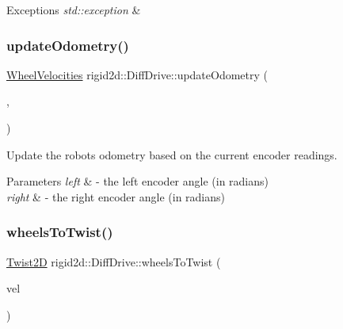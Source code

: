 \begin{DoxyExceptions}{Exceptions}
{\em std\+::exception} & \\
\hline
\end{DoxyExceptions}
\mbox{\label{classrigid2d_1_1DiffDrive_af0ec14baf8f1bd40e1d55226f087ef74}} 
\subsubsection{\texorpdfstring{update\+Odometry()}{updateOdometry()}}
{\footnotesize\ttfamily \hyperlink{structrigid2d_1_1WheelVelocities}{Wheel\+Velocities} rigid2d\+::\+Diff\+Drive\+::update\+Odometry (\begin{DoxyParamCaption}\item[{double}]{,  }\item[{double}]{ }\end{DoxyParamCaption})}



Update the robot\textquotesingle{}s odometry based on the current encoder readings. 


\begin{DoxyParams}{Parameters}
{\em left} & -\/ the left encoder angle (in radians) \\
\hline
{\em right} & -\/ the right encoder angle (in radians) \\
\hline
\end{DoxyParams}
\mbox{\label{classrigid2d_1_1DiffDrive_a726f6bc97c6431bd80164e0403f36c2b}} 
\subsubsection{\texorpdfstring{wheels\+To\+Twist()}{wheelsToTwist()}}
{\footnotesize\ttfamily \hyperlink{classrigid2d_1_1Twist2D}{Twist2D} rigid2d\+::\+Diff\+Drive\+::wheels\+To\+Twist (\begin{DoxyParamCaption}\item[{\hyperlink{structrigid2d_1_1WheelVelocities}{Wheel\+Velocities}}]{vel }\end{DoxyParamCaption})}



